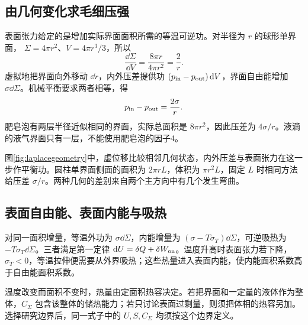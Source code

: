 \subsection{由几何变化求毛细压强}
\label{th:laplacegeometry}
表面张力给定的是增加实际界面面积所需的等温可逆功。对半径为 $r$ 的球形单界面，
$\Sigma=4\pi r^2$、$V=4\pi r^3/3$，所以
\[
 \frac{\dd\Sigma}{\dd V}
 =\frac{8\pi r}{4\pi r^2}=\frac2r.
\]
虚拟地把界面向外移动 $\dd r$，内外压差提供功
$(p_{\rm in}-p_{\rm out})\mathop{}\!\mathrm d V$，界面自由能增加
$\sigma\dd\Sigma$。机械平衡要求两者相等，得
\[
 p_{\rm in}-p_{\rm out}=\frac{2\sigma}{r}.
\]
肥皂泡有两层半径近似相同的界面，实际总面积是 $8\pi r^2$，因此压差为 $4\sigma/r$。液滴的液气界面只有一层，不能使用肥皂泡的因子4。

图\ref{fig:laplacegeometry}中，虚位移比较相邻几何状态，内外压差与表面张力在这一步作平衡功。圆柱单界面侧面的面积为 $2\pi rL$，体积为 $\pi r^2L$，固定 $L$ 时相同方法给压差 $\sigma/r$。两种几何的差别来自两个主方向中有几个发生弯曲。

\subsection{表面自由能、表面内能与吸热}
对同一面积增量，等温外功为 $\sigma\dd\Sigma$，内能增量为
$(\sigma-T\sigma_T)\dd\Sigma$，可逆吸热为
$-T\sigma_T\dd\Sigma$。三者满足第一定律
$\mathop{}\!\mathrm d U=\delta Q+\delta W_{\rm on}$。温度升高时表面张力若下降，$\sigma_T<0$，等温拉伸便需要从外界吸热；这些热量进入表面内能，使内能面积系数高于自由能面积系数。

温度改变而面积不变时，热量由定面积热容决定。若把界面和一定量的液体作为整体，$C_\Sigma$ 包含该整体的储热能力；若只讨论表面过剩量，则须把体相的热容另加。选择研究边界后，同一式子中的 $U,S,C_\Sigma$ 均须按这个边界定义。


